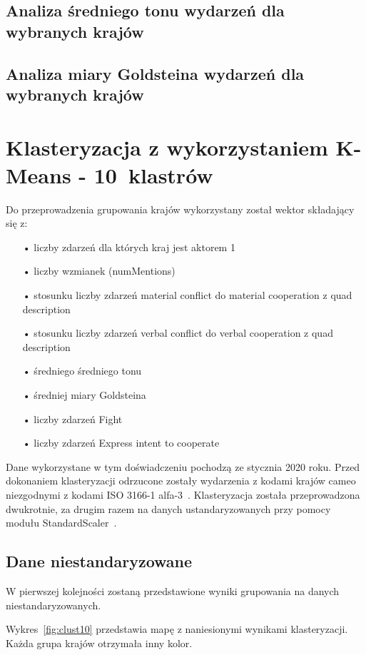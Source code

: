 \documentclass[11pt]{report}
\begin{document}
    \section{Analiza średniego tonu wydarzeń dla wybranych krajów}


    \section{Analiza miary Goldsteina wydarzeń dla wybranych krajów}


    \chapter{Klasteryzacja z wykorzystaniem K-Means - 10~klastrów}

    Do przeprowadzenia grupowania krajów wykorzystany został wektor składający się z:
    \begin{enumerate}
        \item[•] liczby zdarzeń dla których kraj jest aktorem 1
        \item[•] liczby wzmianek (numMentions)
        \item[•] stosunku liczby zdarzeń material conflict do material cooperation z quad description
        \item[•] stosunku liczby zdarzeń verbal conflict do verbal cooperation z quad description
        \item[•] średniego średniego tonu
        \item[•] średniej miary Goldsteina
        \item[•] liczby zdarzeń Fight
        \item[•] liczby zdarzeń Express intent to cooperate
    \end{enumerate}
    Dane wykorzystane w tym doświadczeniu pochodzą ze stycznia 2020 roku.
    Przed dokonaniem klasteryzacji odrzucone zostały wydarzenia z kodami krajów cameo niezgodnymi z kodami ISO 3166-1 alfa-3~\cite{iso_alfa3}.
    Klasteryzacja została przeprowadzona dwukrotnie, za drugim razem na danych ustandaryzowanych przy pomocy modułu StandardScaler~\cite{standardScaler}.


    \section{Dane niestandaryzowane}
    W pierwszej kolejności zostaną przedstawione wyniki grupowania na danych niestandaryzowanych.

    Wykres~\ref{fig:clust10} przedstawia mapę z naniesionymi wynikami klasteryzacji. Każda grupa krajów otrzymała inny kolor.
\end{document}
